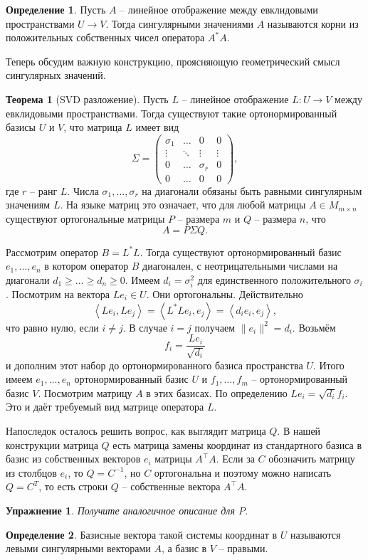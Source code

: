 \documentclass[10pt,a4paper,oneside]{book}
\newtheorem{uprz}{\color{violet!100!black} Упражнение}
\theoremstyle{definition}
\newtheorem*{defn}{\color{yellow!30!red} Определение}
\newtheorem{thm}{\color{red!40!black}Теорема}
\renewcommand{\geq}{\geqslant}
\def\lan{\left\langle }
\def\ran{\right\rangle}
\def\thrm{\begin{thm}}
\def\ethrm{\end{thm}}
\def\dfn{\begin{defn}}
\def\edfn{\end{defn}}
\def\pmat{\begin{pmatrix}}
\def\epmat{\end{pmatrix}}
\def\upr{\begin{uprz}}
\def\eupr{\end{uprz}}
\begin{document}
\dfn Пусть $A$ -- линейное отображение между евклидовыми пространствами $U \to V$. Тогда сингулярными значениями $A$ называются корни из положительных собственных чисел оператора $A^*A$.
\edfn



Теперь обсудим важную конструкцию, проясняющую геометрический смысл сингулярных значений.


\thrm[SVD разложение] Пусть $L$ -- линейное отображение $L\colon U \to V$ между евклидовыми пространствами. Тогда существуют такие ортонормированный базисы $U$ и $V$, что матрица $L$ имеет вид 
$$\Sigma=\pmat \sigma_1 &\dots& 0 & 0\\
 \vdots & \ddots &\vdots & \vdots\\
 0 & \dots & \sigma_r & 0\\
 0 &  \dots & 0 & 0 \epmat,$$
 где $r$ -- ранг $L$. Числа $\sigma_1, \dots, \sigma_r$ на диагонали обязаны быть равными сингулярным значениям $L$.
На языке матриц это означает, что для любой матрицы $A \in M_{m\times n}$ существуют ортогональные матрицы  $P$ -- размера $m$ и $Q$ -- размера $n$,  что
$$A= P \Sigma Q.$$
 
\proof Рассмотрим оператор $B = L^{*}L$. Тогда существуют ортонормированный базис $e_1,\dots,e_n$ в котором оператор $B$ диагонален, с неотрицательными числами на диагонали $d_1\geq\dots\geq d_n\geq 0$. Имеем  $d_i=\sigma_i^2$ для единственного положительного $\sigma_i$. 
Посмотрим на вектора $Le_i \in U$. Они ортогональны. Действительно
$$\lan Le_i, Le_j\ran = \lan L^{*}Le_i,e_j \ran = \lan d_i e_i,e_j\ran,$$
что равно нулю, если $i\neq j$. В случае $i=j$ получаем $\|e_i\|^2=d_i$. Возьмём 
$$f_i=\frac{Le_i}{\sqrt{d_i}}$$
и дополним этот набор до ортонормированного базиса пространства $U$. Итого имеем $e_1,\dots,e_n$ ортонормированный базис $U$ и $f_1,\dots,f_m$ -- ортонормированный базис $V$.
Посмотрим матрицу $A$ в этих базисах. По определению $Le_i=\sqrt{d_i}f_i$. Это и даёт требуемый вид матрице оператора $L$.


Напоследок осталось решить вопрос, как выглядит матрица $Q$. В нашей конструкции матрица $Q$ есть матрица замены координат из стандартного базиса в базис из собственных векторов $e_i$ матрицы $A^{\top}A$. Если за $C$ обозначить матрицу из столбцов $e_i$, то $Q=C^{-1}$, но $C$ ортогональна и поэтому можно написать $Q=C^{T}$, то есть строки $Q$ -- собственные вектора $A^{\top}A$.
\endproof
\ethrm

\upr Получите аналогичное описание для $P$.
\eupr

\dfn Базисные вектора такой системы координат в $U$ называются левыми сингулярными векторами $A$, а базис в $V$ -- правыми.  
\edfn
\end{document}
